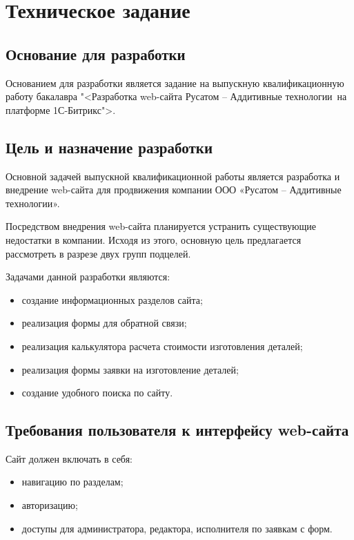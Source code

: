 \section{Техническое задание}
\subsection{Основание для разработки}

Основанием для разработки является задание на выпускную квалификационную работу бакалавра "<Разработка web-сайта \textquotedbl Русатом -- Аддитивные технологии\textquotedbl\ на платформе 1С-Битрикс">.

\subsection{Цель и назначение разработки}

Основной задачей выпускной квалификационной работы является разработка и внедрение web-сайта для продвижения компании ООО «Русатом – Аддитивные технологии».

Посредством внедрения web-сайта планируется устранить существующие недостатки в компании. Исходя из этого, основную цель предлагается рассмотреть в разрезе двух групп подцелей.

Задачами данной разработки являются:
\begin{itemize}
\item создание информационных разделов сайта;
\item    реализация формы для обратной связи;
\item реализация калькулятора расчета стоимости изготовления деталей;
\item реализация формы заявки на изготовление деталей;
\item создание удобного поиска по сайту.
\end{itemize}

\subsection{Требования пользователя к интерфейсу web-сайта}

Сайт должен включать в себя:
\begin{itemize}
    \item навигацию по разделам;
    \item авторизацию;
    \item доступы для администратора, редактора, исполнителя по заявкам с форм.
\end{itemize}

